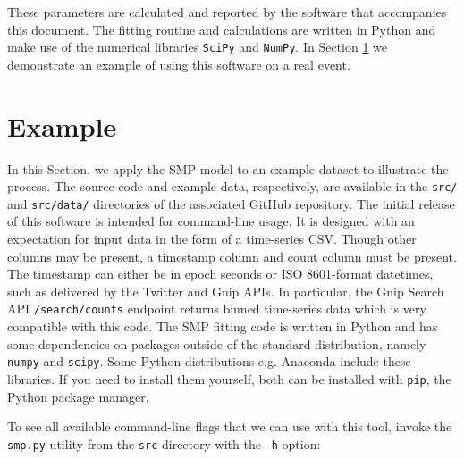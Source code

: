 \documentclass{article}
\begin{document}
These parameters are calculated and reported by the software that accompanies this document.\cite{pulse} The fitting routine and calculations are written in Python and make use of the numerical libraries \texttt{SciPy} and \texttt{NumPy}.\cite{Jones} In Section \ref{sec:smp-example} we demonstrate an example of using this software on a real event. 




\section{Example}
\label{sec:smp-example}

In this Section, we apply the SMP model to an example dataset to illustrate the process. The source code and example data, respectively, are available in the \texttt{src/} and \texttt{src/data/} directories of the associated GitHub repository.\cite{pulse} The initial release of this software is intended for command-line usage. It is designed with an expectation for input data in the form of a time-series CSV. Though other columns may be present, a timestamp column and count column must be present. The timestamp can either be in epoch seconds or ISO 8601-format datetimes,\cite{wiki:iso} such as delivered by the Twitter and Gnip APIs. In particular, the Gnip Search API \texttt{/search/counts} endpoint returns binned time-series data which is very compatible with this code. The SMP fitting code is written in Python and has some dependencies on packages outside of the standard distribution, namely \texttt{numpy} and \texttt{scipy}. Some Python distributions e.g. Anaconda\cite{anaconda} include these libraries. If you need to install them yourself, both can be installed with \texttt{pip}, the Python package manager. 

To see all available command-line flags that we can use with this tool, invoke the \texttt{smp.py} utility from the \texttt{src} directory with the \texttt{-h} option:
\end{document}
